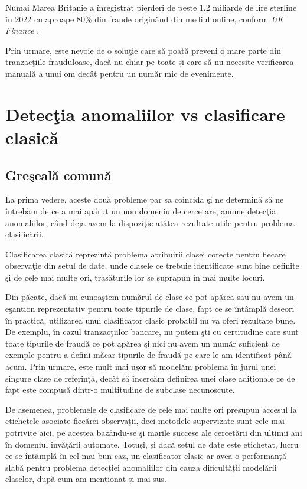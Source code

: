 Numai Marea Britanie a înregistrat pierderi de peste 1.2 
miliarde de lire sterline în 2022 cu aproape 80\% din fraude
originând din mediul online, conform \textit{UK Finance}
\cite{uk-finance}.

Prin urmare, este nevoie de o soluţie care să poată 
preveni o mare parte din tranzacţiile frauduloase, dacă
nu chiar pe toate și care să nu necesite verificarea manuală
a unui om decât pentru un număr mic de evenimente.


\section{Detecţia anomaliilor vs clasificare clasică}

\subsection{Greşeală comună}

La prima vedere, aceste două probleme par sa coincidă şi ne determină
să ne întrebăm de ce a mai apărut un nou domeniu de cercetare, anume detecţia
anomaliilor, când deja avem la dispoziţie atâtea rezultate utile pentru 
problema clasificării. 

Clasificarea clasică reprezintă problema 
atribuirii clasei corecte pentru fiecare observaţie din setul de date,
unde clasele ce trebuie identificate sunt bine definite şi de cele mai
multe ori, trasăturile lor se suprapun în mai multe locuri.

Din păcate, dacă nu cunoaştem numărul de clase ce pot apărea 
sau nu avem un eşantion reprezentativ pentru toate tipurile de clase, fapt ce se 
întâmplă deseori în practică, utilizarea unui clasificator clasic probabil 
nu va oferi rezultate bune. De exemplu, 
în cazul tranzacţiilor bancare, nu putem şti cu certitudine care sunt toate 
tipurile de fraudă ce pot apărea şi nici nu avem un număr suficient de exemple 
pentru a defini măcar tipurile de fraudă pe care le-am identificat până acum.
Prin urmare, este mult mai uşor să modelăm problema în jurul unei singure clase 
de referință, decât să încercăm definirea unei clase adiţionale ce de fapt 
este compusă dintr-o multitudine de subclase necunoscute.

De asemenea, problemele de clasificare de cele mai multe ori presupun 
accesul la etichetele asociate fiecărei observaţii, deci metodele 
supervizate sunt cele mai potrivite aici, pe acestea bazându-se
şi marile succese ale cercetării din ultimii ani în domeniul învăţării automate.
Totuşi, și dacă setul de date 
este etichetat, lucru ce se întâmplă în cel mai bun caz, un clasificator 
clasic ar avea o performanță slabă pentru problema detecției anomaliilor
din cauza dificultății modelării claselor, după cum am menționat și mai sus.

